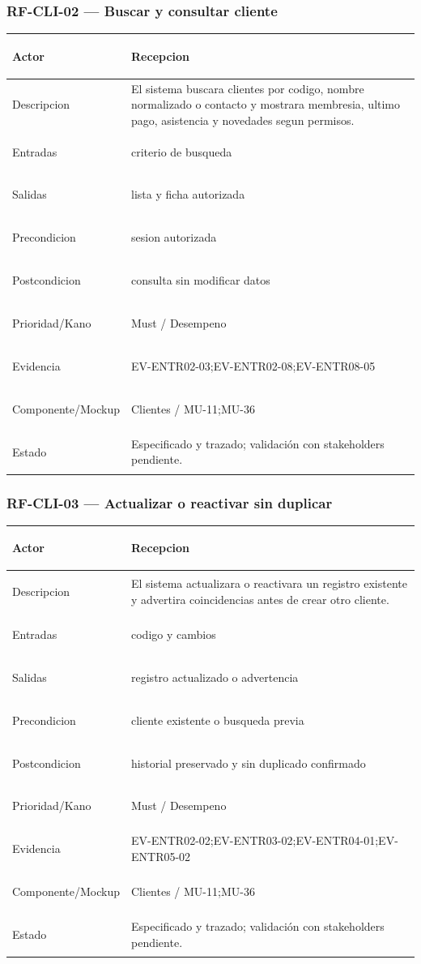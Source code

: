 \documentclass[11pt,a4paper,twoside]{article}
\begin{document}
\subsubsection{RF-CLI-02 — Buscar y consultar cliente}
\begingroup
\renewcommand{\arraystretch}{1.12}
\setlength{\tabcolsep}{5pt}
\begin{tabularx}{\textwidth}{|>{\bfseries\raggedright\arraybackslash}p{3.35cm}|>{\raggedright\arraybackslash}X|}
\hline
Actor & Recepcion \\ \hline
Descripcion & El sistema buscara clientes por codigo, nombre normalizado o contacto y mostrara membresia, ultimo pago, asistencia y novedades segun permisos. \\ \hline
Entradas & criterio de busqueda \\ \hline
Salidas & lista y ficha autorizada \\ \hline
Precondicion & sesion autorizada \\ \hline
Postcondicion & consulta sin modificar datos \\ \hline
Prioridad/Kano & Must / Desempeno \\ \hline
Evidencia & EV-ENTR02-03;EV-ENTR02-08;EV-ENTR08-05 \\ \hline
Componente/Mockup & Clientes / MU-11;MU-36 \\ \hline
Estado & Especificado y trazado; validación con stakeholders pendiente. \\ \hline
\end{tabularx}
\endgroup

\subsubsection{RF-CLI-03 — Actualizar o reactivar sin duplicar}
\begingroup
\renewcommand{\arraystretch}{1.12}
\setlength{\tabcolsep}{5pt}
\begin{tabularx}{\textwidth}{|>{\bfseries\raggedright\arraybackslash}p{3.35cm}|>{\raggedright\arraybackslash}X|}
\hline
Actor & Recepcion \\ \hline
Descripcion & El sistema actualizara o reactivara un registro existente y advertira coincidencias antes de crear otro cliente. \\ \hline
Entradas & codigo y cambios \\ \hline
Salidas & registro actualizado o advertencia \\ \hline
Precondicion & cliente existente o busqueda previa \\ \hline
Postcondicion & historial preservado y sin duplicado confirmado \\ \hline
Prioridad/Kano & Must / Desempeno \\ \hline
Evidencia & EV-ENTR02-02;EV-ENTR03-02;EV-ENTR04-01;EV-ENTR05-02 \\ \hline
Componente/Mockup & Clientes / MU-11;MU-36 \\ \hline
Estado & Especificado y trazado; validación con stakeholders pendiente. \\ \hline
\end{tabularx}
\endgroup
\end{document}
